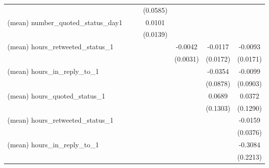 {\begin{tabular}{l*{6}{c}}
                    &                     &                     &    (0.0585)         &                     &                     &                     \\
(mean) number\_quoted\_status\_day1&                     &                     &      0.0101         &                     &                     &                     \\
                    &                     &                     &    (0.0139)         &                     &                     &                     \\
(mean) hours\_retweeted\_status\_1&                     &                     &                     &     -0.0042         &     -0.0117         &     -0.0093         \\
                    &                     &                     &                     &    (0.0031)         &    (0.0172)         &    (0.0171)         \\
(mean) hours\_in\_reply\_to\_1&                     &                     &                     &                     &     -0.0354         &     -0.0099         \\
                    &                     &                     &                     &                     &    (0.0878)         &    (0.0903)         \\
(mean) hours\_quoted\_status\_1&                     &                     &                     &                     &      0.0689         &      0.0372         \\
                    &                     &                     &                     &                     &    (0.1303)         &    (0.1290)         \\
(mean) hours\_retweeted\_status\_1&                     &                     &                     &                     &                     &     -0.0159         \\
                    &                     &                     &                     &                     &                     &    (0.0376)         \\
(mean) hours\_in\_reply\_to\_1&                     &                     &                     &                     &                     &     -0.3084         \\
                    &                     &                     &                     &                     &                     &    (0.2213)         \\

\end{tabular}}
